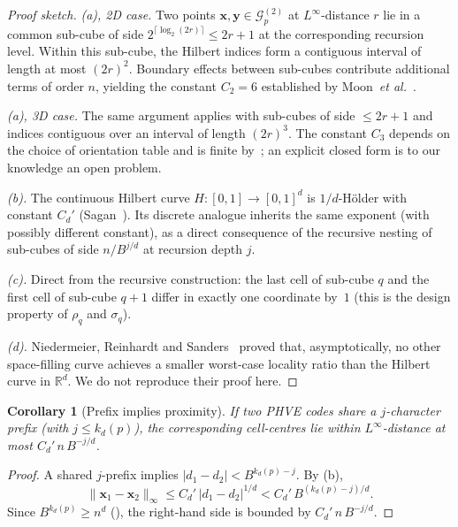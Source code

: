 \documentclass[11pt,a4paper]{article}
\theoremstyle{plain}
\newtheorem{corollary}[theorem]{Corollary}
\theoremstyle{definition}
\theoremstyle{remark}
\newcommand{\R}{\mathbb{R}}
\newcommand{\Grid}{\mathcal{G}}
\begin{document}
\begin{proof}[Proof sketch]
\emph{(a), 2D case.} Two points $\mathbf{x},\mathbf{y}\in\Grid_p^{(2)}$
at $L^\infty$-distance $r$ lie in a common sub-cube of side
$2^{\lceil\log_2(2r)\rceil}\leq 2r+1$ at the corresponding recursion
level. Within this sub-cube, the Hilbert indices form a contiguous
interval of length at most $(2r)^2$. Boundary effects between sub-cubes
contribute additional terms of order $n$, yielding the constant $C_2=6$
established by Moon~\textit{et al.}~\cite{moon2001}.

\emph{(a), 3D case.} The same argument applies with sub-cubes of side
$\leq 2r+1$ and indices contiguous over an interval of length $(2r)^3$.
The constant $C_3$ depends on the choice of orientation table and is
finite by~\cite{hamilton2008}; an explicit closed form is to our
knowledge an open problem.

\emph{(b).} The continuous Hilbert curve $H:[0,1]\to[0,1]^d$ is
$1/d$-H\"older with constant $C_d'$ (Sagan~\cite[Theorem~2.4.4]{sagan1994}).
Its discrete analogue inherits the same exponent (with possibly different
constant), as a direct consequence of the recursive nesting of sub-cubes
of side $n/B^{j/d}$ at recursion depth $j$.

\emph{(c).} Direct from the recursive construction: the last cell of
sub-cube $q$ and the first cell of sub-cube $q+1$ differ in exactly one
coordinate by~$1$ (this is the design property of $\rho_q$ and
$\sigma_q$).

\emph{(d).} Niedermeier, Reinhardt and Sanders~\cite{niedermeier2002}
proved that, asymptotically, no other space-filling curve achieves a
smaller worst-case locality ratio than the Hilbert curve in $\R^d$. We
do not reproduce their proof here.
\end{proof}

\begin{corollary}[Prefix implies proximity]\label{cor:prefix}
If two PHVE codes share a $j$-character prefix (with $j\leq k_d(p)$),
the corresponding cell-centres lie within $L^\infty$-distance at most
$C_d'\, n\, B^{-j/d}$.
\end{corollary}

\begin{proof}
A shared $j$-prefix implies $|d_1-d_2| < B^{k_d(p)-j}$. By
(b),
\[
\|\mathbf{x}_1-\mathbf{x}_2\|_\infty \leq C_d'\,|d_1-d_2|^{1/d}
< C_d'\,B^{(k_d(p)-j)/d}.
\]
Since $B^{k_d(p)}\geq n^d$ (), the right-hand side is
bounded by $C_d'\,n\,B^{-j/d}$.
\end{proof}
\end{document}

